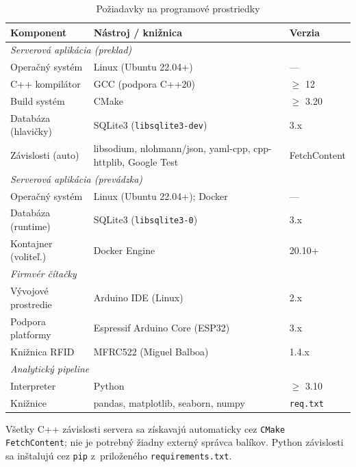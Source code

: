 \documentclass[a4paper]{feidipsp}
\begin{document}
\begin{table}[!htbp]
\centering
\footnotesize
\renewcommand{\arraystretch}{1.15}
\caption{Požiadavky na programové prostriedky}\label{t:sw-req}
\begin{tabular}{|l|p{5.5cm}|l|} \hline
\textbf{Komponent} & \textbf{Nástroj / knižnica} & \textbf{Verzia} \\ \hline
\multicolumn{3}{|l|}{\emph{Serverová aplikácia (preklad)}} \\ \hline
Operačný systém      & Linux (Ubuntu 22.04+) & --- \\ \hline
C++ kompilátor       & GCC (podpora C++20) & $\geq$ 12 \\ \hline
Build systém         & CMake & $\geq$ 3.20 \\ \hline
Databáza (hlavičky)  & SQLite3 (\texttt{libsqlite3-dev}) & 3.x \\ \hline
Závislosti (auto)    & libsodium, nlohmann/json, yaml-cpp, cpp-httplib, Google Test & FetchContent \\ \hline
\multicolumn{3}{|l|}{\emph{Serverová aplikácia (prevádzka)}} \\ \hline
Operačný systém      & Linux (Ubuntu 22.04+); Docker & --- \\ \hline
Databáza (runtime)   & SQLite3 (\texttt{libsqlite3-0}) & 3.x \\ \hline
Kontajner (voliteľ.) & Docker Engine & 20.10+ \\ \hline
\multicolumn{3}{|l|}{\emph{Firmvér čítačky}} \\ \hline
Vývojové prostredie  & Arduino IDE (Linux) & 2.x \\ \hline
Podpora platformy    & Espressif Arduino Core (ESP32) & 3.x \\ \hline
Knižnica RFID        & MFRC522 (Miguel Balboa) & 1.4.x \\ \hline
\multicolumn{3}{|l|}{\emph{Analytický pipeline}} \\ \hline
Interpreter          & Python & $\geq$ 3.10 \\ \hline
Knižnice             & pandas, matplotlib, seaborn, numpy & \texttt{req.txt} \\ \hline
\end{tabular}
\end{table}

\noindent Všetky C++ závislosti servera sa získavajú automaticky cez \texttt{CMake FetchContent}; nie je potrebný žiadny externý správca balíkov. Python závislosti sa inštalujú cez \texttt{pip} z~priloženého \texttt{requirements.txt}.
\end{document}
